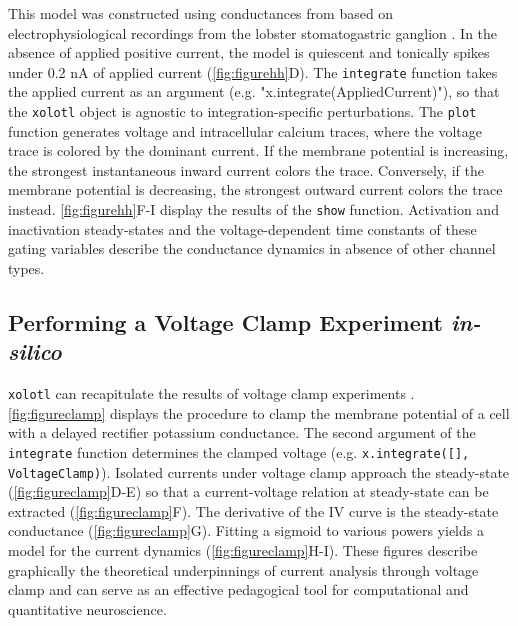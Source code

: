 \documentclass{frontiersSCNS} %
\begin{document}
This model was constructed using conductances from \cite{liuModelNeuronActivitydependent1998} based on electrophysiological recordings from the lobster stomatogastric ganglion \autocite{turrigianoSelectiveRegulationCurrent1995}. In the absence of applied positive current, the model is quiescent and tonically spikes under 0.2 nA of applied current (\ref{fig:figurehh}D). The \texttt{integrate} function takes the applied current as an argument (e.g. "x.integrate(AppliedCurrent)"), so that the \texttt{xolotl} object is agnostic to integration-specific perturbations. The \texttt{plot} function generates voltage and intracellular calcium traces, where the voltage trace is colored by the dominant current. If the membrane potential is increasing, the strongest instantaneous inward current colors the trace. Conversely, if the membrane potential is decreasing, the strongest outward current colors the trace instead. \ref{fig:figurehh}F-I display the results of the \texttt{show} function. Activation and inactivation steady-states and the voltage-dependent time constants of these gating variables describe the conductance dynamics in absence of other channel types.

%
%
%
%
%
%

\subsection{Performing a Voltage Clamp Experiment \textit{in-silico}}

\texttt{xolotl} can recapitulate the results of voltage clamp experiments \autocite{turrigianoSelectiveRegulationCurrent1995, swensenMultiplePeptidesConverge2000, swensenModulatorsConvergentCellular2001, destexheDynamicClampPrinciplesApplications2009}. \ref{fig:figureclamp} displays the procedure to clamp the membrane potential of a cell with a delayed rectifier potassium conductance. The second argument of the \texttt{integrate} function determines the clamped voltage (e.g. \texttt{x.integrate([], VoltageClamp)}). Isolated currents under voltage clamp approach the steady-state (\ref{fig:figureclamp}D-E) so that a current-voltage relation at steady-state can be extracted (\ref{fig:figureclamp}F). The derivative of the IV curve is the steady-state conductance (\ref{fig:figureclamp}G). Fitting a sigmoid to various powers yields a model for the current dynamics (\ref{fig:figureclamp}H-I). These figures describe graphically the theoretical underpinnings of current analysis through voltage clamp and can serve as an effective pedagogical tool for computational and quantitative neuroscience.
\end{document}
